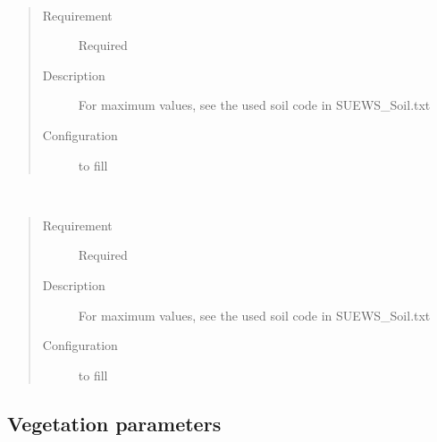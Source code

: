 \documentclass[letterpaper,10pt,english]{sphinxmanual}
\begin{document}
\begin{fulllineitems}
\label{\detokenize{input_files/Initial_Conditions/Soil_moisture_states:cmdoption-arg-soilstoregrassstate}}~\begin{quote}\begin{description}
\item[{Requirement}] \leavevmode
Required

\item[{Description}] \leavevmode
For maximum values, see the used soil code in SUEWS\_Soil.txt

\item[{Configuration}] \leavevmode
to fill

\end{description}\end{quote}

\end{fulllineitems}


\begin{fulllineitems}
\label{\detokenize{input_files/Initial_Conditions/Soil_moisture_states:cmdoption-arg-soilstorebsoilstate}}~\begin{quote}\begin{description}
\item[{Requirement}] \leavevmode
Required

\item[{Description}] \leavevmode
For maximum values, see the used soil code in SUEWS\_Soil.txt

\item[{Configuration}] \leavevmode
to fill

\end{description}\end{quote}

\end{fulllineitems}



\subsection{Vegetation parameters}
\label{\detokenize{input_files/Initial_Conditions/Vegetation_parameters:vegetation-parameters}}\label{\detokenize{input_files/Initial_Conditions/Vegetation_parameters::doc}}\label{\detokenize{input_files/Initial_Conditions/Vegetation_parameters:id1}}
\end{document}
